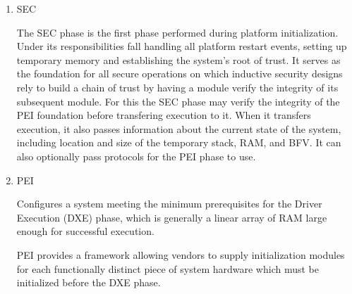\begin{enumerate}
    \item{\acf{SEC}}



    The \ac{SEC} phase is the first phase performed during platform initialization. Under its responsibilities fall handling all platform restart events, setting up temporary memory and establishing the system's root of trust. It serves as the foundation for all secure operations on which inductive security designs rely to build a chain of trust by having a module verify the integrity of its subsequent module. For this the \ac{SEC} phase may verify the integrity of the \ac{PEI} foundation before transfering execution to it. When it transfers execution, it also passes information about the current state of the system, including location and size of the temporary stack, \ac{RAM}, and \ac{BFV}. It can also optionally pass protocols for the \ac{PEI} phase to use.

    \item{\acf{PEI}}

    Configures a system meeting the minimum prerequisites for the Driver Execution (DXE) phase, which is generally a linear array of RAM large enough for successful execution.

    PEI provides a framework allowing vendors to supply initialization modules for each functionally distinct piece of system hardware which must be initialized before the DXE phase.


\end{enumerate}
